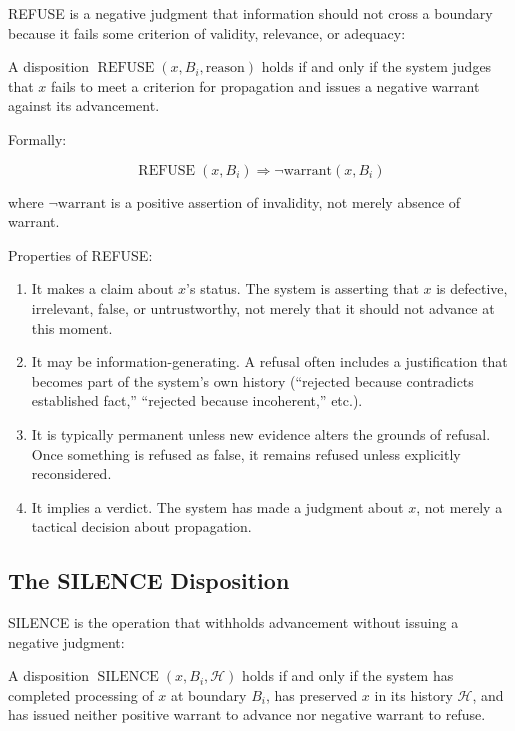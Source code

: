 \documentclass[12pt]{article}
\begin{document}
REFUSE is a negative judgment that information should not cross a boundary because it fails some criterion of validity, relevance, or adequacy:

\begin{definition}
A disposition $\operatorname{REFUSE}(x, B_i, \text{reason})$ holds if and only if the system judges that $x$ fails to meet a criterion for propagation and issues a negative warrant against its advancement.
\end{definition}

Formally:

\begin{equation}
\operatorname{REFUSE}(x, B_i) \Rightarrow \neg \text{warrant}(x, B_i)
\end{equation}

where $\neg \text{warrant}$ is a positive assertion of invalidity, not merely absence of warrant.

Properties of REFUSE:
\begin{enumerate}
\item It makes a claim about $x$'s status. The system is asserting that $x$ is defective, irrelevant, false, or untrustworthy, not merely that it should not advance at this moment.
\item It may be information-generating. A refusal often includes a justification that becomes part of the system's own history (``rejected because contradicts established fact,'' ``rejected because incoherent,'' etc.).
\item It is typically permanent unless new evidence alters the grounds of refusal. Once something is refused as false, it remains refused unless explicitly reconsidered.
\item It implies a verdict. The system has made a judgment about $x$, not merely a tactical decision about propagation.
\end{enumerate}

\subsection{The SILENCE Disposition}

SILENCE is the operation that withholds advancement without issuing a negative judgment:

\begin{definition}
A disposition $\operatorname{SILENCE}(x, B_i, \mathcal{H})$ holds if and only if the system has completed processing of $x$ at boundary $B_i$, has preserved $x$ in its history $\mathcal{H}$, and has issued neither positive warrant to advance nor negative warrant to refuse.
\end{definition}
\end{document}
